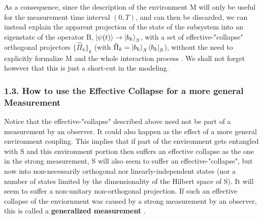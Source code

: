 \documentclass[11pt, a4paper]{article} %
\begin{document}
As a consequence, since the description of the environment M will only be useful for the measurement time interval $(0,T)$, and can then be discarded, we can instead explain the apparent projection of the state of the subsystem into an eigenstate of the operator B, $\ket{\psi(t)}\to \ket{b_k}_S$, with a set of effective-"collapse" orthogonal projectors $\{\hat{\Pi}_k\}_k$ (with $\hat{\Pi}_k=\ket{b_k}_S\bra{b_k}_S$), without the need to explicitly formalize M and the whole interaction process \cite{Durr}. We shall not forget however that this is just a short-cut in the modeling.\vspace{-0.3cm}



\subsubsection*{1.3. How to use the Effective Collapse for a more general Measurement}\vspace{-0.1cm}

Notice that the effective-"collapse" described above need not be part of a measurement by an observer. It could also happen as the effect of a more general environment coupling. This implies that if part of the environment gets entangled with S and this environment portion then suffers an effective collapse as the one in the strong measurement, S will also seem to suffer an effective-"collapse", but now into non-necessarily orthogonal nor linearly-independent states (nor a number of states limited by the dimensionality of the Hilbert space of S). It will seem to suffer a non-unitary non-orthogonal projection. If such an effective collapse of the enviornment was caused by a strong measurement by an observer, this is called a {\bf generalized measurement} \cite{Generalized, Durr}. 
\end{document}
